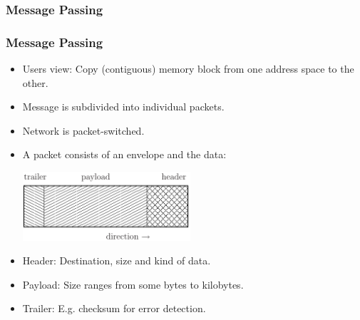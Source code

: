 \subsubsection{Message Passing}
\begin{frame}
\frametitle<presentation>{Message Passing}

\begin{itemize}
\item Users view: Copy (contiguous) memory block from one address space to the
  other.
\item Message is subdivided into individual packets.
\item Network is packet-switched. 
\item A packet consists of an envelope and
  the data:
\begin{center}
  \includegraphics[width=0.49\textwidth]{EPS/paket}
\end{center}
\item Header: Destination, size and kind of data.
\item Payload: Size ranges from some bytes to kilobytes.
\item Trailer: E.g. checksum for error detection.
\end{itemize}
\end{frame}

